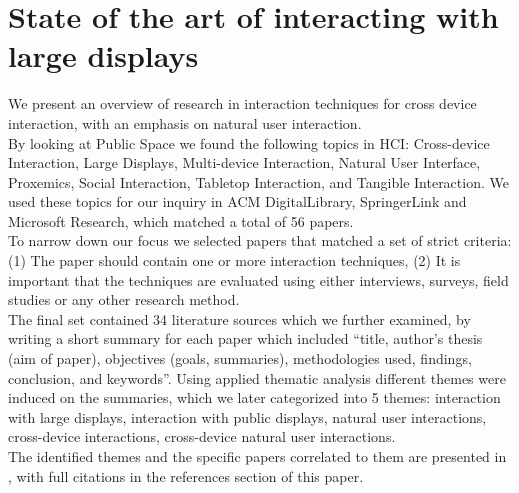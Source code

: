 \section{State of the art of interacting with large displays}
We present an overview of research in interaction techniques for cross device interaction, with an emphasis on natural user interaction.\\

By looking at Public Space we found the following topics in HCI: Cross-device Interaction, Large Displays, Multi-device Interaction, Natural User Interface, Proxemics, Social Interaction, Tabletop Interaction, and Tangible Interaction. We used these topics for our inquiry in ACM DigitalLibrary, SpringerLink and Microsoft Research, which matched a total of 56 papers. \\

To narrow down our focus we selected papers that matched a set of strict criteria: (1) The paper should contain one or more interaction techniques, (2) It is important that the techniques are evaluated using either interviews, surveys, field studies or any other research method.\\

The final set contained 34 literature sources which we further examined, by writing a short summary for each paper which included ``title, author's thesis (aim of paper), objectives (goals, summaries), methodologies used, findings, conclusion, and keywords''. 
Using applied thematic analysis different themes were induced on the summaries, which we later categorized into 5 themes: interaction with large displays, interaction with public displays, natural user interactions, cross-device interactions, cross-device natural user interactions.\\

The identified themes and the specific papers correlated to them are presented in , with full citations in the references section of this paper. 


